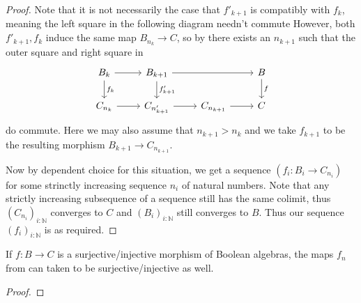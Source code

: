 \begin{proof}
  Note that it is not necessarily the case that 
  $f'_{k+1}$ is compatibly with $f_k$, meaning the left square in the following diagram needn't commute 
  However, both $f'_{k+1}, f_k$ induce the same map $B_{n_k} \to C$, 
  so by  there exists an $n_{k+1}$ 
  such that the outer square and right square in 
  \begin{equation}
    \begin{tikzcd}
      B_{k} \arrow[r] \arrow[d, "f_k"]& B_{{k+1}} \arrow[rr] \arrow[d,"f'_{k+1}"]& & B \arrow[d,"f"] \\
      C_{n_k} \arrow[r] & C_{n'_{k+1}} \arrow[r] & C_{n_{k+1}} \arrow[r] & C 
    \end{tikzcd}
  \end{equation}
  do commute. 
  Here we may also assume that $n_{k+1}>n_k$ 
  and we take $f_{k+1}$ to be the resulting morphism $B_{k+1} \to C_{n_{k+1}}$. 

  Now by dependent choice for this situation, we get a sequence $(f_i:B_i \to C_{n_i})$  for some 
  strinctly increasing sequence $n_i$ of natural numbers. 
  Note that any strictly increasing subsequence of a sequence still has the same colimit, 
  thus $(C_{n_i})_{i:\mathbb N}$ converges to $C$ and $(B_i)_{i:\mathbb N}$ still converges to $B$. 
  Thus our sequence $(f_i)_{i:\mathbb N}$ is as required. 

\end{proof}
\begin{lemma}
  If $f:B \to C$ is a surjective/injective morphism of Boolean algebras, 
  the maps $f_n$ from  can taken to 
  be surjective/injective as well. 
\end{lemma}
\begin{proof}
\end{proof}



